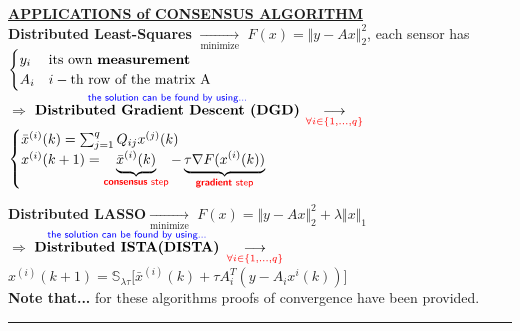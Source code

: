 \documentclass[a4paper, 12pt]{article}
\begin{document}
\noindent
{\underline{\normalsize\textbf{APPLICATIONS of CONSENSUS ALGORITHM}}}\\
\textbf{\textsf{Distributed Least-Squares}} $\underset{\text{minimize}}{\longrightarrow}$ $F(x)=\Vert y-Ax \Vert_2^2$, each sensor has $\begin{cases}
    y_i & \text{its own \textbf{measurement}}\\
    A_i & i-\text{th row of the matrix A}
\end{cases}$ \\
$\Longrightarrow$ 
$\overset{\textsf{\color{blue}the solution can be found by using...}}{\textbf{Distributed Gradient Descent (DGD)}}$
    $\underset{\color{red}\forall i\in\{1,...,q\}}{\longrightarrow}$
  $ \begin{cases}
    \bar{x}^{(i)}(k)=\sum_{j=1}^{q} Q_{ij}x^{(j)}(k) \\
    x^{(i)}(k+1)=\underbrace{\bar{x}^{(i)}(k)}_\textsf{\color{red} \textbf{consensus} step}-\underbrace{\tau\nabla F(x^{(i)}(k))}_\textsf{\color{red}\textbf{gradient} step}
\end{cases}$

\noindent
\textbf{\textsf{Distributed LASSO}}$\underset{\text{minimize}}{\longrightarrow}$ $F(x)=\Vert y-Ax \Vert_2^2 + \lambda \Vert x \Vert_1$\\
$\Longrightarrow$ 
$\overset{\textsf{\color{blue}the solution can be found by using...}}{\textbf{Distributed ISTA(DISTA)}}$
$\underset{\color{red}\forall i\in\{1,...,q\}}{\longrightarrow}$
{\large{
    $x^{(i)}(k+1)=\mathbb{S}_{\lambda\tau}\big[ 
        \bar{x}^{(i)}(k) +
        \tau A_i^T(y-A_ix^{i}(k))    
    \big]$
}}\\

\noindent
{\small{
    \textbf{Note that...} for these algorithms proofs of convergence have been provided.
}}

\begin{center}
    \rule{300pt}{.2pt}
    \vspace{-1ex}
\end{center}


\end{document}
